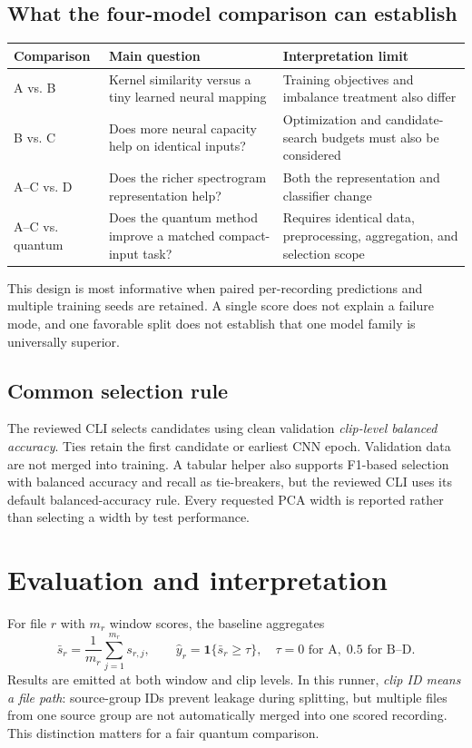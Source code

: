 \documentclass[11pt,letterpaper]{article}
\begin{document}
\subsection{What the four-model comparison can establish}
\begin{center}
\small
\begin{tabularx}{\linewidth}{@{}lYY@{}}
\toprule
Comparison & Main question & Interpretation limit \\
\midrule
A vs. B & Kernel similarity versus a tiny learned neural mapping & Training
objectives and imbalance treatment also differ \\
B vs. C & Does more neural capacity help on identical inputs? & Optimization
and candidate-search budgets must also be considered \\
A--C vs. D & Does the richer spectrogram representation help? & Both the
representation and classifier change \\
A--C vs. quantum & Does the quantum method improve a matched compact-input task?
& Requires identical data, preprocessing, aggregation, and selection scope \\
\bottomrule
\end{tabularx}
\end{center}
This design is most informative when paired per-recording predictions and
multiple training seeds are retained. A single score does not explain a failure
mode, and one favorable split does not establish that one model family is
universally superior.

\subsection{Common selection rule}
The reviewed CLI selects candidates using clean validation \emph{clip-level
balanced accuracy}. Ties retain the first candidate or earliest CNN epoch.
Validation data are not merged into training. A tabular helper also supports
F1-based selection with balanced accuracy and recall as tie-breakers, but the
reviewed CLI uses its default balanced-accuracy rule. Every requested PCA width
is reported rather than selecting a width by test performance.

\section{Evaluation and interpretation}
For file $r$ with $m_r$ window scores, the baseline aggregates
\begin{equation}
 \bar{s}_r=\frac{1}{m_r}\sum_{j=1}^{m_r}s_{r,j},\qquad
 \widehat{y}_r=\mathbf{1}\{\bar{s}_r\geq\tau\},
 \quad \tau=0\text{ for A},\;0.5\text{ for B--D}.
 \label{eq:aggregation}
\end{equation}
Results are emitted at both window and clip levels. In this runner,
\emph{clip ID means a file path}: source-group IDs prevent leakage during
splitting, but multiple files from one source group are not automatically merged
into one scored recording. This distinction matters for a fair quantum comparison.
\end{document}
